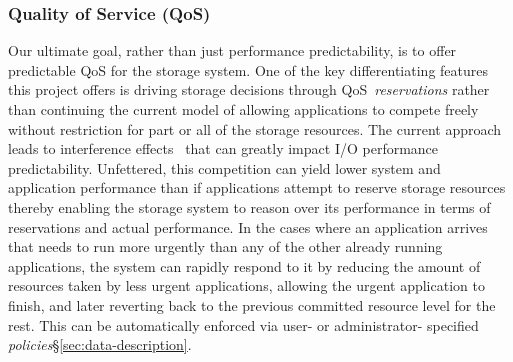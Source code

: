 \subsubsection{Quality of Service (QoS)}
Our ultimate goal, rather than just performance predictability, is to offer
predictable QoS for the storage system.
One of the key differentiating features this project offers is driving storage
decisions through QoS~\emph{reservations} rather than continuing the current
model of allowing applications to compete freely without restriction for part
or all of the storage resources. The current approach leads to interference
effects~\cite{lofstead:2010:io-variability,liu_hotstorage} that can greatly
impact I/O performance predictability. 
Unfettered, this competition can yield lower system and application performance
than if applications attempt to reserve storage resources thereby enabling the
storage system to reason over its performance in terms of reservations and
actual performance.  In the cases where an application arrives that needs to
run more urgently than any of the other already running applications, the
system can rapidly respond to it by reducing the amount of resources taken by
less urgent applications, allowing the urgent application to finish, and later
reverting back to the previous committed resource level for the rest.  This can
be automatically enforced via user- or administrator- specified
\textit{policies}\S\ref{sec:data-description}.


